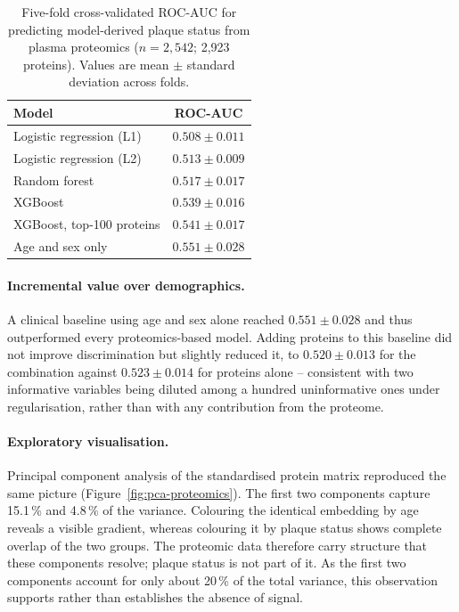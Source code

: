 \begin{table}[H]
\centering
\caption[Phase 1A classification performance]{Five-fold cross-validated ROC-AUC for predicting
model-derived plaque status from plasma proteomics ($n=2{,}542$; 2{,}923 proteins). Values are
mean $\pm$ standard deviation across folds.}
\label{tab:phase1a-auc}
\begin{tabular}{lc}
\hline
Model & ROC-AUC \\
\hline
Logistic regression (L1) & $0.508 \pm 0.011$ \\
Logistic regression (L2) & $0.513 \pm 0.009$ \\
Random forest & $0.517 \pm 0.017$ \\
XGBoost & $0.539 \pm 0.016$ \\
XGBoost, top-100 proteins & $0.541 \pm 0.017$ \\
\hline
Age and sex only & $0.551 \pm 0.028$ \\
\hline
\end{tabular}
\end{table}

\paragraph{Incremental value over demographics.}
A clinical baseline using age and sex alone reached $0.551 \pm 0.028$ and thus outperformed every
proteomics-based model. Adding proteins to this baseline did not improve discrimination but
slightly reduced it, to $0.520 \pm 0.013$ for the combination against $0.523 \pm 0.014$ for
proteins alone -- consistent with two informative variables being diluted among a hundred
uninformative ones under regularisation, rather than with any contribution from the proteome.

\paragraph{Exploratory visualisation.}
Principal component analysis of the standardised protein matrix reproduced the same picture
(Figure~\ref{fig:pca-proteomics}). The first two components capture 15.1\,\% and 4.8\,\% of the
variance. Colouring the identical embedding by age reveals a visible gradient, whereas colouring
it by plaque status shows complete overlap of the two groups. The proteomic data therefore carry
structure that these components resolve; plaque status is not part of it. As the first two
components account for only about 20\,\% of the total variance, this observation supports rather
than establishes the absence of signal.

